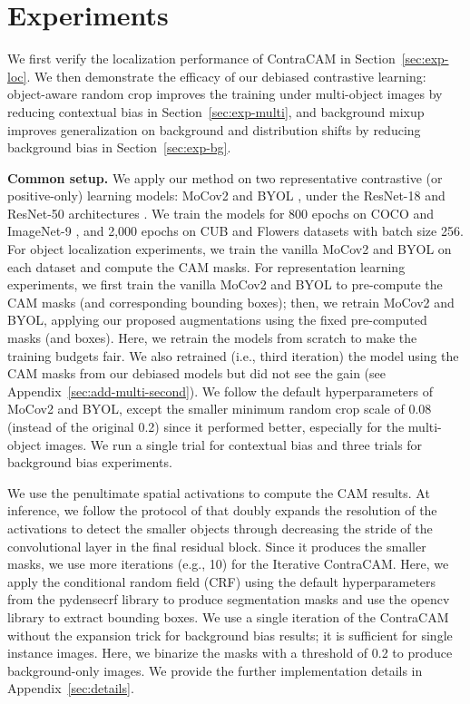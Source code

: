 \documentclass{article}
\begin{document}
\section{Experiments}
\label{sec:exp}

We first verify the localization performance of ContraCAM in Section~\ref{sec:exp-loc}. We then demonstrate the efficacy of our debiased contrastive learning: object-aware random crop improves the training under multi-object images by reducing contextual bias in Section~\ref{sec:exp-multi}, and background mixup improves generalization on background and distribution shifts by reducing background bias in Section~\ref{sec:exp-bg}.



\textbf{Common setup.}
We apply our method on two representative contrastive (or positive-only) learning models: MoCov2 \citep{chen2020improved} and BYOL \citep{grill2020bootstrap}, under the ResNet-18 and ResNet-50 architectures \citep{he2016deep}. We train the models for 800 epochs on COCO \citep{lin2014microsoft} and ImageNet-9 \citep{xiao2021noise}, and 2,000 epochs on CUB \citep{welinder2010caltech} and Flowers \citep{nilsback2006visual} datasets with batch size 256. For object localization experiments, we train the vanilla MoCov2 and BYOL on each dataset and compute the CAM masks. For representation learning experiments, we first train the vanilla MoCov2 and BYOL to pre-compute the CAM masks (and corresponding bounding boxes); then, we retrain MoCov2 and BYOL, applying our proposed augmentations using the fixed pre-computed masks (and boxes). Here, we retrain the models from scratch to make the training budgets fair. We also retrained (i.e., third iteration) the model using the CAM masks from our debiased models but did not see the gain (see Appendix~\ref{sec:add-multi-second}). We follow the default hyperparameters of MoCov2 and BYOL, except the smaller minimum random crop scale of 0.08 (instead of the original 0.2) since it performed better, especially for the multi-object images. We run a single trial for contextual bias and three trials for background bias experiments.

We use the penultimate spatial activations to compute the CAM results. At inference, we follow the protocol of \citep{choe2020evaluating} that doubly expands the resolution of the activations to detect the smaller objects through decreasing the stride of the convolutional layer in the final residual block. Since it produces the smaller masks, we use more iterations (e.g., 10) for the Iterative ContraCAM. Here, we apply the conditional random field (CRF) using the default hyperparameters from the pydensecrf library \citep{krahenbuhl2011efficient} to produce segmentation masks and use the opencv \citep{opencv_library} library to extract bounding boxes. We use a single iteration of the ContraCAM without the expansion trick for background bias results; it is sufficient for single instance images. Here, we binarize the masks with a threshold of 0.2 to produce background-only images. We provide the further implementation details in Appendix~\ref{sec:details}.
\end{document}
